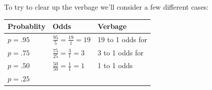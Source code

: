 \documentclass[]{book}
\theoremstyle{definition}
\theoremstyle{definition}
\theoremstyle{remark}
\begin{document}
To try to clear up the verbage we'll consider a few different cases:

\begin{longtable}[]{@{}lll@{}}
\toprule
\begin{minipage}[b]{0.18\columnwidth}\raggedright\strut
Probablity\strut
\end{minipage} & \begin{minipage}[b]{0.47\columnwidth}\raggedright\strut
Odds\strut
\end{minipage} & \begin{minipage}[b]{0.27\columnwidth}\raggedright\strut
Verbage\strut
\end{minipage}\tabularnewline
\midrule
\endhead
\begin{minipage}[t]{0.18\columnwidth}\raggedright\strut
\(p=.95\)\strut
\end{minipage} & \begin{minipage}[t]{0.47\columnwidth}\raggedright\strut
\(\frac{95}{5} = \frac{19}{1} = 19\)\strut
\end{minipage} & \begin{minipage}[t]{0.27\columnwidth}\raggedright\strut
19 to 1 odds for\strut
\end{minipage}\tabularnewline
\begin{minipage}[t]{0.18\columnwidth}\raggedright\strut
\(p=.75\)\strut
\end{minipage} & \begin{minipage}[t]{0.47\columnwidth}\raggedright\strut
\(\frac{75}{25} = \frac{3}{1} = 3\)\strut
\end{minipage} & \begin{minipage}[t]{0.27\columnwidth}\raggedright\strut
3 to 1 odds for\strut
\end{minipage}\tabularnewline
\begin{minipage}[t]{0.18\columnwidth}\raggedright\strut
\(p=.50\)\strut
\end{minipage} & \begin{minipage}[t]{0.47\columnwidth}\raggedright\strut
\(\frac{50}{50} = \frac{1}{1} = 1\)\strut
\end{minipage} & \begin{minipage}[t]{0.27\columnwidth}\raggedright\strut
1 to 1 odds\strut
\end{minipage}\tabularnewline
\begin{minipage}[t]{0.18\columnwidth}\raggedright\strut
\(p=.25\)\strut
\end{minipage} & \begin{minipage}[t]{0.47\columnwidth}\raggedright\strut

\end{minipage}
\end{longtable}
\end{document}

